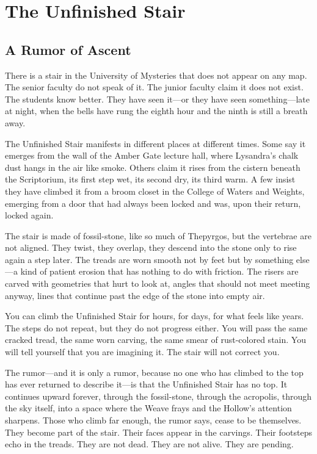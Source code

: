\documentclass[10pt,twocolumn]{book}
\begin{document}
\section{The Unfinished Stair}

\subsection{A Rumor of Ascent}

There is a stair in the University of Mysteries that does not appear on any map. The senior faculty do not speak of it. The junior faculty claim it does not exist. The students know better. They have seen it---or they have seen something---late at night, when the bells have rung the eighth hour and the ninth is still a breath away.

The Unfinished Stair manifests in different places at different times. Some say it emerges from the wall of the Amber Gate lecture hall, where Lysandra's chalk dust hangs in the air like smoke. Others claim it rises from the cistern beneath the Scriptorium, its first step wet, its second dry, its third warm. A few insist they have climbed it from a broom closet in the College of Waters and Weights, emerging from a door that had always been locked and was, upon their return, locked again.

The stair is made of fossil-stone, like so much of Thepyrgos, but the vertebrae are not aligned. They twist, they overlap, they descend into the stone only to rise again a step later. The treads are worn smooth not by feet but by something else---a kind of patient erosion that has nothing to do with friction. The risers are carved with geometries that hurt to look at, angles that should not meet meeting anyway, lines that continue past the edge of the stone into empty air.

You can climb the Unfinished Stair for hours, for days, for what feels like years. The steps do not repeat, but they do not progress either. You will pass the same cracked tread, the same worn carving, the same smear of rust-colored stain. You will tell yourself that you are imagining it. The stair will not correct you.

The rumor---and it is only a rumor, because no one who has climbed to the top has ever returned to describe it---is that the Unfinished Stair has no top. It continues upward forever, through the fossil-stone, through the acropolis, through the sky itself, into a space where the Weave frays and the Hollow's attention sharpens. Those who climb far enough, the rumor says, cease to be themselves. They become part of the stair. Their faces appear in the carvings. Their footsteps echo in the treads. They are not dead. They are not alive. They are pending.
\end{document}
